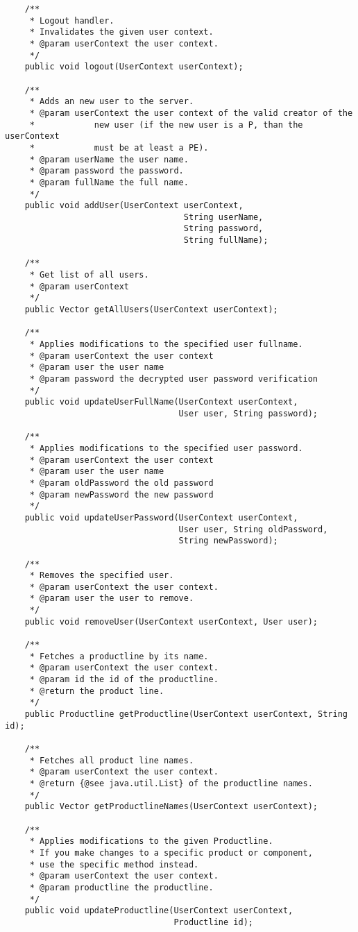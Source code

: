 \begin{verbatim}
	/**
	 * Logout handler.
	 * Invalidates the given user context.
	 * @param userContext the user context.
	 */
    public void logout(UserContext userContext);
	
	/**
	 * Adds an new user to the server.
	 * @param userContext the user context of the valid creator of the
	 * 			  new user (if the new user is a P, than the userContext
	 * 			  must be at least a PE).
	 * @param userName the user name.
	 * @param password the password.
	 * @param fullName the full name.
	 */
	public void addUser(UserContext userContext,
									String userName,
									String password,
									String fullName);
		
    /**
     * Get list of all users.
     * @param userContext
     */
    public Vector getAllUsers(UserContext userContext);
    
	/**
     * Applies modifications to the specified user fullname.
	 * @param userContext the user context
	 * @param user the user name
	 * @param password the decrypted user password verification
     */
    public void updateUserFullName(UserContext userContext,
    					           User user, String password);

	/**
     * Applies modifications to the specified user password.
	 * @param userContext the user context
	 * @param user the user name
	 * @param oldPassword the old password
	 * @param newPassword the new password
     */
    public void updateUserPassword(UserContext userContext,
    					   		   User user, String oldPassword,
    					   		   String newPassword);

	/**
     * Removes the specified user.
     * @param userContext the user context.
     * @param user the user to remove.
     */
    public void removeUser(UserContext userContext, User user);

    /**
     * Fetches a productline by its name.
     * @param userContext the user context.
     * @param id the id of the productline.
     * @return the product line.
     */
    public Productline getProductline(UserContext userContext, String id);

    /**
     * Fetches all product line names.
     * @param userContext the user context.
     * @return {@see java.util.List} of the productline names.
     */
    public Vector getProductlineNames(UserContext userContext);

    /**
	 * Applies modifications to the given Productline.
	 * If you make changes to a specific product or component,
	 * use the specific method instead.
	 * @param userContext the user context.
	 * @param productline the productline. 
	 */
	public void updateProductline(UserContext userContext,
								  Productline id);
    

\end{verbatim}
